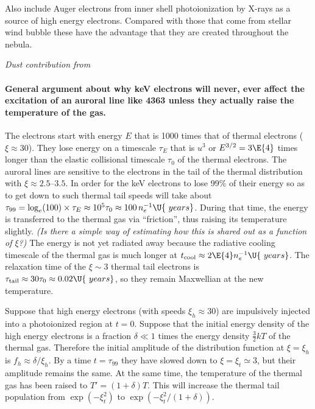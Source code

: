 \documentclass{emulateapj}
\begin{document}
Also include Auger electrons from inner shell photoionization by
X-rays as a source of high energy electrons.  Compared with those that
come from stellar wind bubble these have the advantage that they are
created throughout the nebula. 

\textit{Dust contribution from \citet{Weingartner:2006a}}

\paragraph{General argument about why keV electrons will never,
  \textbf{ever} affect the excitation of an auroral line like 4363
  unless they actually raise the temperature of the gas.}  The
electrons start with energy \(E\)
that is 1000 times that of thermal electrons (\(\xi \approx 30\)).
They lose energy on a timescale \(\tau_E\)
that is \(u^3\)
or \(E^{3/2} = 3\E{4}\)
times longer than the elastic collisional timescale \(\tau_0\)
of the thermal electrons.  The auroral lines are sensitive to the
electrons in the tail of the thermal distribution with
\(\xi \approx 2.5\)--\(3.5\).
In order for the keV electrons to lose 99\% of their energy so as to
get down to such thermal tail speeds will take about
\(\tau_{99} = \log_e(100) \times \tau_E \approx 10^5 \tau_0 \approx
100 \,n_e^{-1} \U{\ years}\).
During that time, the energy is transferred to the thermal gas via
``friction'', thus raising its temperature slightly.  \textit{(Is
  there a simple way of estimating how this is shared out as a
  function of \(\xi\)?)}
The energy is not yet radiated away because the radiative cooling
timescale of the thermal gas is much longer at
\(t_{\mathrm{cool}} \approx 2\E{4} n_e^{-1} \U{\ years}\).
The relaxation time of the \(\xi \sim 3\)
thermal tail electrons is
\(\tau_{\mathrm{tail}} \approx 30 \tau_0 \approx 0.02 \U{\ years}\),
so they remain Maxwellian at the new temperature.

Suppose that high energy electrons (with speeds \(\xi_h \approx 30\))
are impulsively injected into a photoionized region at \(t = 0\). 
Suppose that the initial energy density of the high energy electrons
is a fraction \(\delta \ll 1\)
times the energy density \(\frac32 k T\)
of the thermal gas.  Therefore the initial amplitude of the distribution
function at \(\xi = \xi_h\) is \(f_h \approx \delta/\xi_h\).   By a
time \(t = \tau_{99}\) they have slowed down to
\(\xi = \xi_t \simeq 3 \), but their amplitude remains the same.  At
the same time, the temperature of the thermal gas has been raised to
\(T' = (1 + \delta) T\).  This will increase the thermal tail
population from \(\exp(-\xi_t^2)\) to \(\exp(-\xi_t^2/(1 + \delta))\).  
\end{document}
